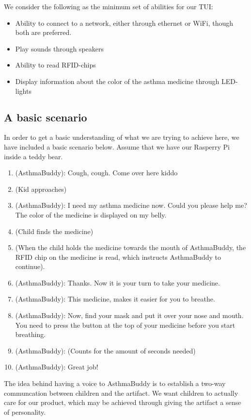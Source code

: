 We consider the following as the minimum set of abilities for our TUI:

\begin{itemize}
  \item Ability to connect to a network, either through ethernet or WiFi, though both are preferred. 
  \item Play sounds through speakers
  \item Ability to read RFID-chips
  \item Display information about the color of the asthma medicine through LED-lights
\end{itemize} 

\subsection{A basic scenario}
In order to get a basic understanding of what we are trying to achieve here, we have included a basic scenario below. Assume that we have our Rasperry Pi inside a teddy bear.  

\begin{enumerate}
  \item (AsthmaBuddy): Cough, cough. Come over here kiddo 
  \item (Kid approaches)
  \item (AsthmaBuddy): I need my asthma medicine now. Could you please help me? The color of the medicine is displayed on my belly.
  \item (Child finds the medicine)
  \item (When the child holds the medicine towards the mouth of AsthmaBuddy, the RFID chip on the medicine is read, which instructs AsthmaBuddy to continue). 
  \item (AsthmaBuddy): Thanks. Now it is your turn to take your medicine. 
  \item (AsthmaBuddy): This medicine, makes it easier for you to breathe. 
  \item (AsthmaBuddy): Now, find your mask and put it over your nose and mouth. You need to press the button at the top of your medicine before you start breathing. 
  \item (AsthmaBuddy): (Counts for the amount of seconds needed)
  \item (AsthmaBuddy): Great job!
\end{enumerate}

The idea behind having a voice to AsthmaBuddy is to establish a two-way communcation between children and the artifact. We want children to actually care for our product, which may be achieved through giving the artifact a sense of personality. 


